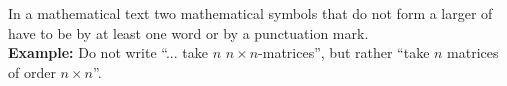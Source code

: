 \documentclass[12pt]{article}
\begin{document}
In a mathematical text two mathematical symbols that do not form a larger  of  have to be  by at least one word or by a punctuation mark.\\
\textbf{Example:} Do not write ``... take $n$ $n\times n$-matrices'', but rather ``take $n$ matrices of order $n\times n$''.
\end{document}
